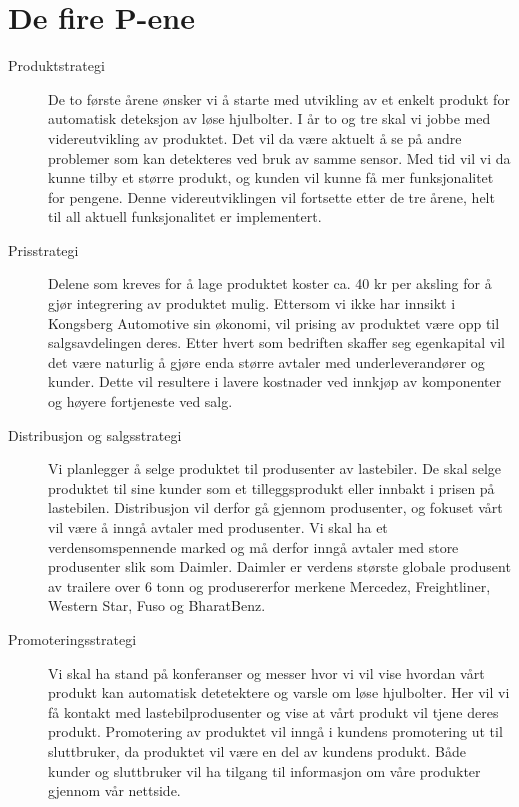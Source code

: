 \section{De fire P-ene}
\begin{description}
	\item[Produktstrategi] De to første årene ønsker vi å starte med utvikling av et enkelt produkt for 		automatisk deteksjon av løse hjulbolter. I år to og tre skal vi jobbe med videreutvikling av 				produktet. Det vil da være aktuelt å se på andre problemer som kan detekteres ved bruk av 			samme sensor. Med tid vil vi da kunne tilby et større produkt, og kunden vil kunne få mer 			funksjonalitet for pengene. Denne videreutviklingen vil fortsette etter de tre årene, helt til all aktuell 		funksjonalitet er implementert.
	\item[Prisstrategi] Delene som kreves for å lage produktet koster ca. 40 kr per aksling for å gjør integrering av produktet mulig. Ettersom vi ikke har innsikt i Kongsberg Automotive sin økonomi, vil prising av produktet være opp til salgsavdelingen deres. Etter hvert som bedriften skaffer seg egenkapital vil det være naturlig å gjøre enda større avtaler med underleverandører og kunder. Dette vil resultere i lavere kostnader ved innkjøp av komponenter og høyere fortjeneste ved salg.
	\item[Distribusjon og salgsstrategi] Vi planlegger å selge produktet til produsenter av lastebiler. De 		skal selge produktet til sine kunder som et tilleggsprodukt eller innbakt i prisen på lastebilen. 			Distribusjon vil derfor gå gjennom produsenter, og fokuset vårt vil være å inngå avtaler med 			produsenter. Vi skal ha et verdensomspennende marked og må derfor inngå avtaler med store 		produsenter slik som Daimler\cite{daimler}. Daimler er verdens største globale produsent av 				trailere over 6 tonn og produsererfor merkene Mercedez, Freightliner, Western Star, Fuso og 			BharatBenz.
	\item[Promoteringsstrategi] Vi skal ha stand på konferanser og messer hvor vi vil vise hvordan vårt 	produkt kan automatisk detetektere og varsle om løse hjulbolter. Her vil vi få kontakt med 			lastebilprodusenter og vise at vårt produkt vil tjene deres produkt. Promotering av produktet vil 		inngå i kundens promotering ut til sluttbruker, da produktet vil være en del av kundens produkt. 		Både kunder og 	sluttbruker vil ha tilgang til informasjon om våre produkter gjennom vår nettside.
\end{description}
